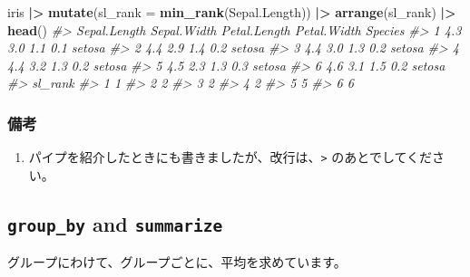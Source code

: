 \documentclass[
  xelatex, ja=standard]{bxjsbook}
\newenvironment{Shaded}{\begin{snugshade}}{\end{snugshade}}
\newcommand{\AttributeTok}[1]{\textcolor[rgb]{0.13,0.29,0.53}{#1}}
\newcommand{\CommentTok}[1]{\textcolor[rgb]{0.56,0.35,0.01}{\textit{#1}}}
\newcommand{\FunctionTok}[1]{\textcolor[rgb]{0.13,0.29,0.53}{\textbf{#1}}}
\newcommand{\NormalTok}[1]{#1}
\newcommand{\SpecialCharTok}[1]{\textcolor[rgb]{0.81,0.36,0.00}{\textbf{#1}}}
\providecommand{\tightlist}{%
  \setlength{\itemsep}{0pt}\setlength{\parskip}{0pt}}
\theoremstyle{definition}
\theoremstyle{definition}
\theoremstyle{definition}
\theoremstyle{definition}
\theoremstyle{remark}
\begin{document}
\begin{Shaded}
\begin{Highlighting}[]
\NormalTok{iris }\SpecialCharTok{|\textgreater{}} \FunctionTok{mutate}\NormalTok{(}\AttributeTok{sl\_rank =} \FunctionTok{min\_rank}\NormalTok{(Sepal.Length)) }\SpecialCharTok{|\textgreater{}} 
  \FunctionTok{arrange}\NormalTok{(sl\_rank) }\SpecialCharTok{|\textgreater{}} \FunctionTok{head}\NormalTok{()}
\CommentTok{\#\textgreater{}   Sepal.Length Sepal.Width Petal.Length Petal.Width Species}
\CommentTok{\#\textgreater{} 1          4.3         3.0          1.1         0.1  setosa}
\CommentTok{\#\textgreater{} 2          4.4         2.9          1.4         0.2  setosa}
\CommentTok{\#\textgreater{} 3          4.4         3.0          1.3         0.2  setosa}
\CommentTok{\#\textgreater{} 4          4.4         3.2          1.3         0.2  setosa}
\CommentTok{\#\textgreater{} 5          4.5         2.3          1.3         0.3  setosa}
\CommentTok{\#\textgreater{} 6          4.6         3.1          1.5         0.2  setosa}
\CommentTok{\#\textgreater{}   sl\_rank}
\CommentTok{\#\textgreater{} 1       1}
\CommentTok{\#\textgreater{} 2       2}
\CommentTok{\#\textgreater{} 3       2}
\CommentTok{\#\textgreater{} 4       2}
\CommentTok{\#\textgreater{} 5       5}
\CommentTok{\#\textgreater{} 6       6}
\end{Highlighting}
\end{Shaded}

\hypertarget{ux5099ux8003-4}{%
\subsubsection{備考}\label{ux5099ux8003-4}}

\begin{enumerate}
\def\labelenumi{\arabic{enumi}.}
\tightlist
\item
  パイプを紹介したときにも書きましたが、改行は、\texttt{\textbar{}\textgreater{}} のあとでしてください。
\end{enumerate}

\hypertarget{group_by-and-summarize}{%
\subsection{\texorpdfstring{\texttt{group\_by} and \texttt{summarize}}{group\_by and summarize}}\label{group_by-and-summarize}}

グループにわけて、グループごとに、平均を求めています。
\end{document}
